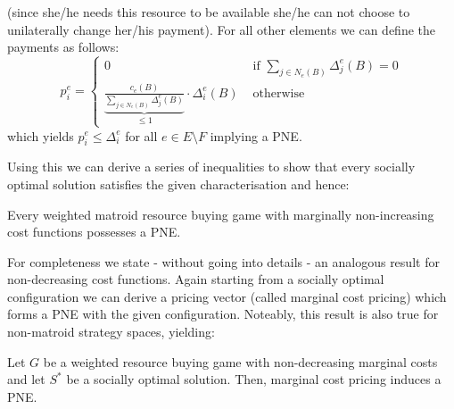 \documentclass{scrartcl}
\theoremstyle{nonumberplain}
\begin{document}
(since she/he needs this resource to be available she/he can not choose to
unilaterally change her/his payment). For all other elements we can define the
payments as follows:
\begin{equation*}
  p_{i}^{e} = \begin{cases}
    0 &\text{ if } \sum_{j\in N_{e}(B)}\Delta_{j}^{e}(B) = 0\\
    \underbrace{
      \frac{c_{e}(B)}{\sum_{j\in N_{e}(B)}\Delta_{j}^{e}(B)}
    }_{\leq 1}\cdot\Delta_{i}^{e}(B) &\text{ otherwise}
  \end{cases}
\end{equation*}
which yields $p_{i}^{e}\leq \Delta_{i}^{e}$ for all $e\in E\setminus F$
implying a PNE.

Using this we can derive a series of inequalities to show that every socially
optimal solution satisfies the given characterisation and hence:
\begin{theo}
  Every weighted matroid resource buying game with marginally non-increasing
  cost functions possesses a PNE.
\end{theo}
For completeness we state - without going into details - an analogous result
for non-decreasing cost functions. Again starting from a socially optimal
configuration we can derive a pricing vector (called marginal cost pricing)
which forms a PNE with the given configuration. Noteably, this result is
also true for non-matroid strategy spaces, yielding:
\begin{theo}
  Let $G$ be a weighted resource buying game with non-decreasing marginal costs
  and let $S^{\ast}$ be a socially optimal solution. Then, marginal cost
  pricing induces a PNE.
\end{theo}
\end{document}
